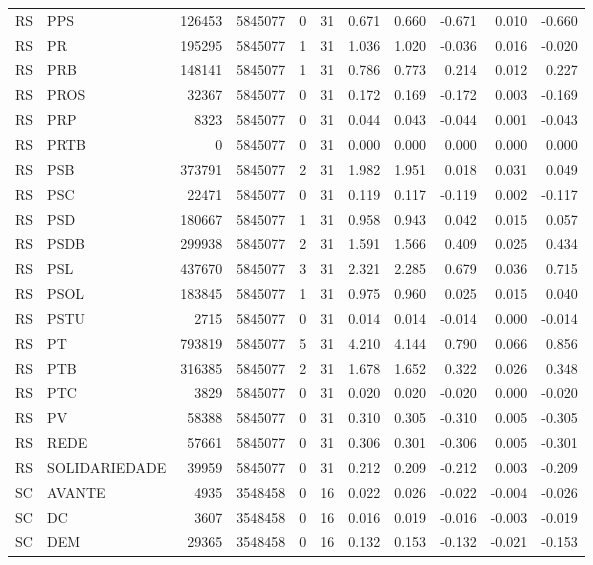 \begin{landscape}
\begin{longtable}{llrrrrrrrrr}
RS & PPS & 126453 & 5845077 & 0 & 31 & 0.671 & 0.660 & -0.671 & 0.010 & -0.660 \\
RS & PR & 195295 & 5845077 & 1 & 31 & 1.036 & 1.020 & -0.036 & 0.016 & -0.020 \\
RS & PRB & 148141 & 5845077 & 1 & 31 & 0.786 & 0.773 & 0.214 & 0.012 & 0.227 \\
RS & PROS & 32367 & 5845077 & 0 & 31 & 0.172 & 0.169 & -0.172 & 0.003 & -0.169 \\
RS & PRP & 8323 & 5845077 & 0 & 31 & 0.044 & 0.043 & -0.044 & 0.001 & -0.043 \\
RS & PRTB & 0 & 5845077 & 0 & 31 & 0.000 & 0.000 & 0.000 & 0.000 & 0.000 \\
RS & PSB & 373791 & 5845077 & 2 & 31 & 1.982 & 1.951 & 0.018 & 0.031 & 0.049 \\
RS & PSC & 22471 & 5845077 & 0 & 31 & 0.119 & 0.117 & -0.119 & 0.002 & -0.117 \\
RS & PSD & 180667 & 5845077 & 1 & 31 & 0.958 & 0.943 & 0.042 & 0.015 & 0.057 \\
RS & PSDB & 299938 & 5845077 & 2 & 31 & 1.591 & 1.566 & 0.409 & 0.025 & 0.434 \\
RS & PSL & 437670 & 5845077 & 3 & 31 & 2.321 & 2.285 & 0.679 & 0.036 & 0.715 \\
RS & PSOL & 183845 & 5845077 & 1 & 31 & 0.975 & 0.960 & 0.025 & 0.015 & 0.040 \\
RS & PSTU & 2715 & 5845077 & 0 & 31 & 0.014 & 0.014 & -0.014 & 0.000 & -0.014 \\
RS & PT & 793819 & 5845077 & 5 & 31 & 4.210 & 4.144 & 0.790 & 0.066 & 0.856 \\
RS & PTB & 316385 & 5845077 & 2 & 31 & 1.678 & 1.652 & 0.322 & 0.026 & 0.348 \\
RS & PTC & 3829 & 5845077 & 0 & 31 & 0.020 & 0.020 & -0.020 & 0.000 & -0.020 \\
RS & PV & 58388 & 5845077 & 0 & 31 & 0.310 & 0.305 & -0.310 & 0.005 & -0.305 \\
RS & REDE & 57661 & 5845077 & 0 & 31 & 0.306 & 0.301 & -0.306 & 0.005 & -0.301 \\
RS & SOLIDARIEDADE & 39959 & 5845077 & 0 & 31 & 0.212 & 0.209 & -0.212 & 0.003 & -0.209 \\
SC & AVANTE & 4935 & 3548458 & 0 & 16 & 0.022 & 0.026 & -0.022 & -0.004 & -0.026 \\
SC & DC & 3607 & 3548458 & 0 & 16 & 0.016 & 0.019 & -0.016 & -0.003 & -0.019 \\
SC & DEM & 29365 & 3548458 & 0 & 16 & 0.132 & 0.153 & -0.132 & -0.021 & -0.153 \\

\end{longtable}
\end{landscape}
